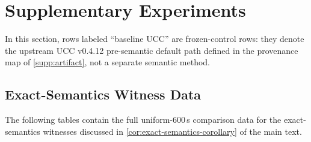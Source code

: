 \section{Supplementary Experiments}
\label{app:supplementary-experiments}

In this section, rows labeled ``baseline UCC'' are frozen-control rows:
they denote the upstream UCC v0.4.12 pre-semantic default path defined in the
provenance map of \cref{supp:artifact}, not a separate semantic method.

\subsection{Exact-Semantics Witness Data}
\label{app:witness-data}

The following tables contain the full uniform-600\,s comparison data for
the exact-semantics witnesses discussed in
\cref{cor:exact-semantics-corollary} of the main text.

\begin{table}[htbp]
\centering
\scriptsize
{}
\caption{Uniform-600\,s comparison on the rational CP finite-range
witness. Completed cells report gates/depth/cx; other entries are status
outcomes and are not scored as structural wins. The family is certified
only for $R \leq T = 131040$, with per-transducer tail constants. No
external row is a formal theorem instance.}
\label{tab:rational-cp-600}
\end{table}

